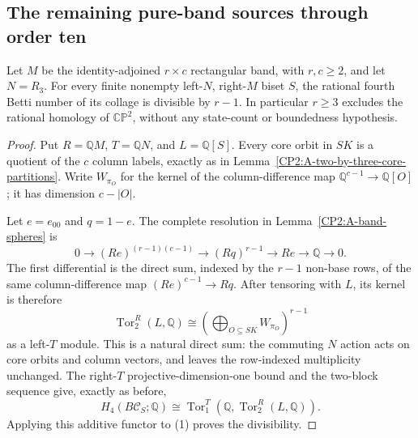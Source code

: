\subsection{The remaining pure-band sources through order ten}

\begin{lemma}
\label{CP2:A-pure-band-fourth-row-multiplicity}
Let $M$ be the identity-adjoined $r\times c$ rectangular
band, with $r,c\ge2$, and let $N=R_3$.
For every finite nonempty left-$N$, right-$M$ biset $S$,
the rational fourth Betti number of its collage is
divisible by $r-1$.  In particular $r\ge3$ excludes
the rational homology of $\mathbb{CP}^2$, without
any state-count or boundedness hypothesis.
\end{lemma}
\begin{proof}
Put $R=\mathbb QM$, $T=\mathbb QN$, and $L=\mathbb Q[S]$.
Every core orbit in $SK$ is a quotient of the $c$
column labels, exactly as in
Lemma~\ref{CP2:A-two-by-three-core-partitions}.
Write $W_{\pi_O}$ for the kernel of the column-difference
map $\mathbb Q^{c-1}\to\mathbb Q[O]$; it has dimension
$c-|O|$.

Let $e=e_{00}$ and $q=1-e$.  The complete resolution
in Lemma~\ref{CP2:A-band-spheres} is
\[
 0\longrightarrow (Re)^{(r-1)(c-1)}
 \longrightarrow (Rq)^{r-1}\longrightarrow Re
 \longrightarrow\mathbb Q\longrightarrow0.
\]
The first differential is the direct sum, indexed by
the $r-1$ non-base rows, of the same column-difference
map $(Re)^{c-1}\to Rq$.
After tensoring with $L$, its kernel is therefore
\[
 \operatorname{Tor}^{R}_2(L,\mathbb Q)
   \cong\left(\bigoplus_{O\subseteq SK}W_{\pi_O}\right)^{r-1}
                                                               \tag{1}
\]
as a left-$T$ module.  This is a natural direct sum:
the commuting $N$ action acts on core orbits and column
vectors, and leaves the row-indexed multiplicity unchanged.
The right-$T$ projective-dimension-one bound and the
two-block sequence give, exactly as before,
\[
 H_4(B\mathcal C_S;\mathbb Q)
 \cong
 \operatorname{Tor}^{T}_1
       (\mathbb Q,\operatorname{Tor}^{R}_2(L,\mathbb Q)).
\]
Applying this additive functor to (1) proves the divisibility.
\end{proof}

